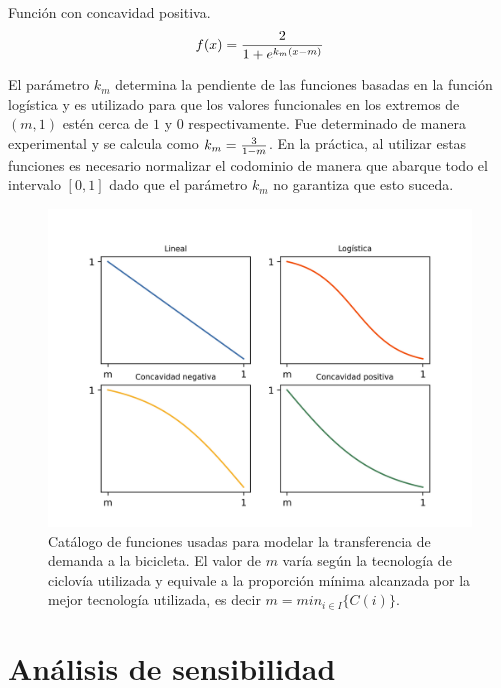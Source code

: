 \begin{definition}
  Función con concavidad positiva.
  \begin{align}
      f(x) = {2 \over 1 + e^{k_m(x - m)}}
  \end{align}
\end{definition}

El parámetro $k_m$ determina la pendiente de las funciones basadas en la función logística y es utilizado para que los valores funcionales en los extremos de $(m, 1)$ estén cerca de $1$ y $0$ respectivamente. Fue determinado de manera experimental y se calcula como $k_m = {3 \over 1 - m}$. En la práctica, al utilizar estas funciones es necesario normalizar el codominio de manera que abarque todo el intervalo $[0, 1]$ dado que el parámetro $k_m$ no garantiza que esto suceda.

\begin{figure}[h!]
  \centering
  \includegraphics[width=12cm]{../resources/f_catalog.png}
    \caption{Catálogo de funciones usadas para modelar la transferencia de demanda a la bicicleta. El valor de $m$ varía según la tecnología de ciclovía utilizada y equivale a la proporción mínima alcanzada por la mejor tecnología utilizada, es decir $m = min_{i \in I} \{ C(i) \}$.}
  \label{fig:fcatalog}
\end{figure}

\FloatBarrier
\section{Análisis de sensibilidad}
\label{sect:sensibilityanalysis}

